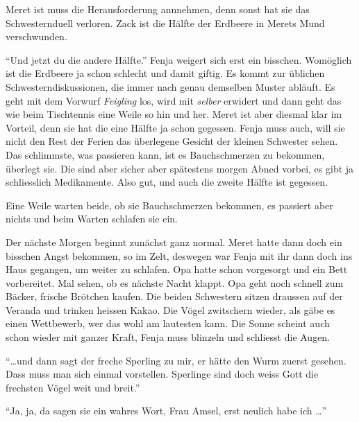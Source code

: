 Meret ist muss die Herausforderung annnehmen, denn sonst hat sie das Schwesternduell verloren. Zack ist die Hälfte der Erdbeere in Merets Mund verschwunden.

\enquote{Und jetzt du die andere Hälfte.} Fenja weigert sich erst ein bisschen. Womöglich ist die Erdbeere ja schon schlecht und damit giftig. Es kommt zur üblichen Schwesterndiskussionen, die immer nach genau demselben Muster abläuft. Es geht mit dem Vorwurf \textit{Feigling} los, wird mit \textit{selber} erwidert und dann geht das wie beim Tischtennis eine Weile so hin und her. Meret ist aber diesmal klar im Vorteil, denn sie hat die eine Hälfte ja schon gegessen. Fenja muss auch, will sie nicht den Rest der Ferien das überlegene Gesicht der kleinen Schwester sehen. Das schlimmste, was passieren kann, ist es Bauchschmerzen zu bekommen, überlegt sie. Die sind aber sicher aber spätestens morgen Abned vorbei, es gibt ja schliesslich Medikamente. Also gut, und auch die zweite Hälfte ist gegessen.

Eine Weile warten beide, ob sie Bauchschmerzen bekommen, es passiert aber nichts und beim Warten schlafen sie ein.

\begin{center}
\aldineleft
\end{center}

Der nächste Morgen beginnt zunächst ganz normal. Meret hatte dann doch ein bisschen Angst bekommen, so im Zelt, deswegen war Fenja mit ihr dann doch ins Haus gegangen, um weiter zu schlafen. Opa hatte schon vorgesorgt und ein Bett vorbereitet. Mal sehen, ob es nächste Nacht klappt. Opa geht noch schnell zum Bäcker, frische Brötchen kaufen. Die beiden Schwestern sitzen draussen auf der Veranda und trinken heissen Kakao. Die Vögel zwitschern wieder, als gäbe es einen Wettbewerb, wer das wohl am lautesten kann. Die Sonne scheint auch schon wieder mit ganzer Kraft, Fenja muss blinzeln und schliesst die Augen.

\enquote{\dots und dann sagt der freche Sperling zu mir, er hätte den Wurm zuerst gesehen. Dass muss man sich einmal vorstellen. Sperlinge sind doch weiss Gott die frechsten Vögel weit und breit.}

\enquote{Ja, ja, da sagen sie ein wahres Wort, Frau Amsel, erst neulich habe ich \dots}


